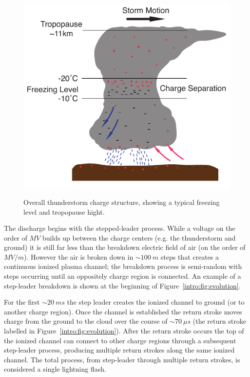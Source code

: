\begin{figure}[ht!]
	\centering
	\includegraphics[scale=1]{Introduction/Figures/thunderstorm_structure.pdf}\\
	\caption{Overall thunderstorm charge structure, showing a typical freezing level and tropopause hight.}
	\label{intro:fig:thunderstorm}
\end{figure}

The discharge begins with the stepped-leader process.
While a voltage on the order of $MV$ builds up between the charge centers (e.g. the thunderstorm and ground) it is still far less than the breakdown electric field of air (on the order of $MV/m$).
However the air is broken down in $\sim100~m$ steps that creates a continuous ionized plasma channel; the breakdown process is semi-random with steps occurring until an oppositely charge region is connected.
An example of a step-leader breakdown is shown at the beginning of Figure~\ref{intro:fig:evolution}.

For the first $\sim20~ms$ the step leader creates the ionized channel to ground (or to another charge region).
Once the channel is established the return stroke moves charge from the ground to the cloud over the course of $\sim70~\mu s$ (the return stroke labelled in Figure~\ref{intro:fig:evolution}).
After the return stroke occurs the top of the ionized channel can connect to other charge regions through a subsequent step-leader process, producing multiple return strokes along the same ionized channel.
The total process, from step-leader through multiple return strokes, is considered a single lightning flash.

